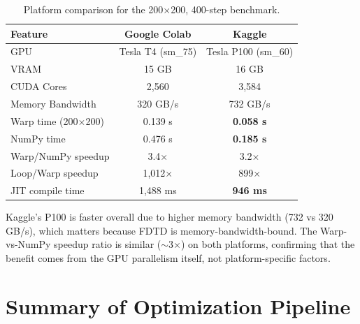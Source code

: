 \documentclass[11pt,a4paper]{article}
\begin{document}
\begin{table}[H]
\centering
\caption{Platform comparison for the 200$\times$200, 400-step benchmark.}
\begin{tabular}{@{}lcc@{}}
\toprule
\textbf{Feature} & \textbf{Google Colab} & \textbf{Kaggle} \\
\midrule
GPU & Tesla T4 (sm\_75) & Tesla P100 (sm\_60) \\
VRAM & 15 GB & 16 GB \\
CUDA Cores & 2,560 & 3,584 \\
Memory Bandwidth & 320 GB/s & 732 GB/s \\
\midrule
Warp time (200$\times$200) & 0.139 s & \textbf{0.058 s} \\
NumPy time & 0.476 s & \textbf{0.185 s} \\
Warp/NumPy speedup & 3.4$\times$ & 3.2$\times$ \\
Loop/Warp speedup & 1,012$\times$ & 899$\times$ \\
\midrule
JIT compile time & 1,488 ms & \textbf{946 ms} \\
\bottomrule
\end{tabular}
\end{table}

Kaggle's P100 is faster overall due to higher memory bandwidth (732 vs 320 GB/s), which matters because FDTD is memory-bandwidth-bound. The Warp-vs-NumPy speedup ratio is similar ($\sim$3$\times$) on both platforms, confirming that the benefit comes from the GPU parallelism itself, not platform-specific factors.


\section{Summary of Optimization Pipeline}
\end{document}
